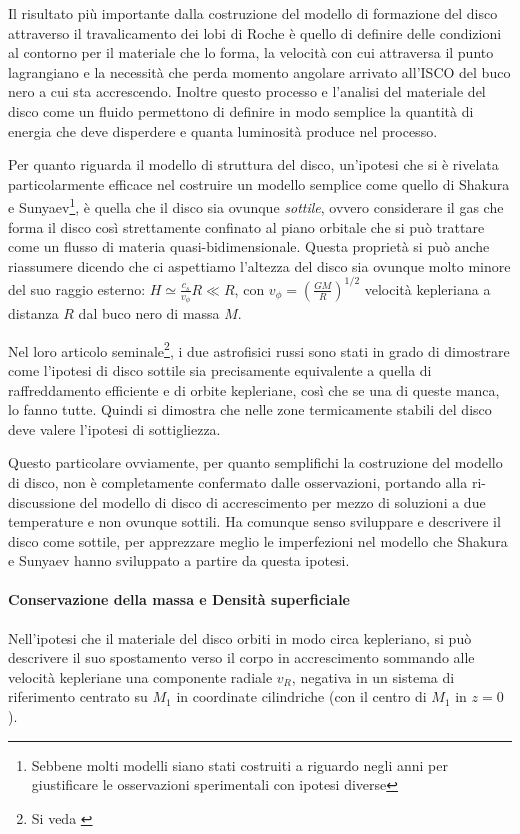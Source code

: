\documentclass[a4paperbi]{article}
\begin{document}
	Il risultato più importante dalla costruzione del modello di formazione del disco attraverso il travalicamento dei lobi di Roche è quello di definire delle condizioni al contorno per il materiale che lo forma, la velocità con cui attraversa il punto lagrangiano e la necessità che perda momento angolare arrivato all'ISCO del buco nero a cui sta accrescendo. Inoltre questo processo e l'analisi del materiale del disco come un fluido permettono di definire in modo semplice la quantità di energia che deve disperdere e quanta luminosità produce nel processo.

	Per quanto riguarda il modello di struttura del disco, un'ipotesi che si è rivelata particolarmente efficace nel costruire un modello semplice come quello di Shakura e Sunyaev\footnote{Sebbene molti modelli siano stati costruiti a riguardo negli anni per giustificare le osservazioni sperimentali con ipotesi diverse}, è quella che il disco sia ovunque \textit{sottile}, ovvero considerare il gas che forma il disco così strettamente confinato al piano orbitale che si può trattare come un flusso di materia quasi-bidimensionale. Questa proprietà si può anche riassumere dicendo che ci aspettiamo l'altezza del disco sia ovunque molto minore del suo raggio esterno: $H\simeq\frac{c_s}{v_\phi}R\ll R$, con $v_\phi=\left(\frac{GM}{R}\right)^{1/2}$ velocità kepleriana a distanza $R$ dal buco nero di massa $M$.
	
	Nel loro articolo seminale\footnote{Si veda \cite{ShakuraSunyaev1973}}, i due astrofisici russi sono stati in grado di dimostrare come l'ipotesi di disco sottile sia precisamente equivalente a quella di raffreddamento efficiente e di orbite kepleriane, così che se una di queste manca, lo fanno tutte. Quindi si dimostra che nelle zone termicamente stabili del disco deve valere l'ipotesi di sottigliezza.
	
	Questo particolare ovviamente, per quanto semplifichi la costruzione del modello di disco, non è completamente confermato dalle osservazioni, portando alla ri-discussione del modello di disco di accrescimento per mezzo di soluzioni a due temperature e non ovunque sottili. Ha comunque senso sviluppare e descrivere il disco come sottile, per apprezzare meglio le imperfezioni nel modello che Shakura e Sunyaev hanno sviluppato a partire da questa ipotesi.
		
	\paragraph{Conservazione della massa e Densità superficiale}
		Nell'ipotesi che il materiale del disco orbiti in modo circa kepleriano, si può descrivere il suo spostamento verso il corpo in accrescimento sommando alle velocità kepleriane una componente radiale $v_R$, negativa in un sistema di riferimento centrato su $M_1$ in coordinate cilindriche (con il centro di $M_1$ in $z=0$).
\end{document}
